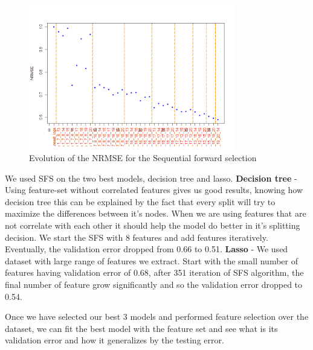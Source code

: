 \begin{figure}[H]
    \centering
        \includegraphics[width=0.8\textwidth]{img/randomForest.png}
    \caption{Evolution of the NRMSE for the Sequential forward selection}\label{fig:rf_sfs}
\end{figure}

We used SFS on the two best models, decision tree and lasso.
\textbf{Decision tree} - Using feature-set without correlated features gives us good results, knowing how decision tree this can be explained by the fact that every split will try to maximize the differences between it's nodes. When we are using features that are not correlate with each other it should help the model do better in it's splitting decision. We start the SFS with 8 features and add features iteratively. Eventually, the validation error dropped from 0.66 to 0.51.
\textbf{Lasso} - We used dataset with large range of features we extract. Start with the small number of features having validation error of 0.68, after 351 iteration of SFS algorithm, the final number of feature grow significantly and so the validation error dropped to 0.54.


%


%






Once we have selected our best 3 models and performed feature selection over the dataset, we can fit the best model with the feature set and see what is its validation error and how it generalizes by the testing error.



